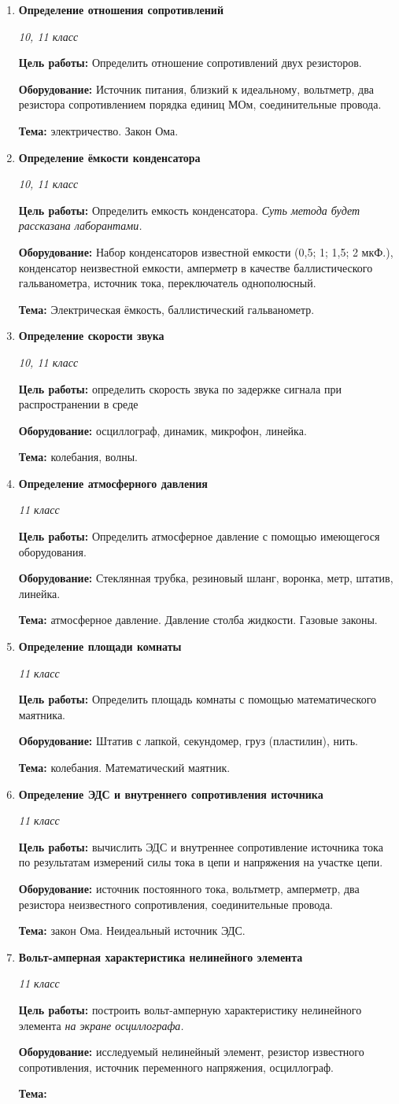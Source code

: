 \documentclass[a4paper,10pt]{article}
\newcommand{\labtitle}[5]{
	\textbf{#2}\par
	\textit{#1 класс}\par
	\textbf{Цель работы:} #3\par
	\textbf{Оборудование:} #4\par
	\textbf{Тема:} #5
}
\begin{document}
\begin{enumerate}
	\item \labtitle
		{10, 11}
		{Определение отношения сопротивлений}
		{Определить отношение сопротивлений двух резисторов.}
		{Источник питания, близкий к идеальному, вольтметр, два резистора сопротивлением порядка единиц МОм, соединительные провода.}
		{электричество. Закон Ома.}
	\item \labtitle
		{10, 11}
		{Определение ёмкости конденсатора}
		{Определить емкость конденсатора. \textit{Суть метода будет рассказана лаборантами.}}
		{Набор конденсаторов известной емкости (0,5; 1; 1,5; 2 мкФ.), конденсатор неизвестной емкости, амперметр в качестве баллистического гальванометра, источник тока, переключатель однополюсный.}
		{Электрическая ёмкость, баллистический гальванометр.}
	\item \labtitle
		{10, 11}
		{Определение скорости звука}
		{определить скорость звука по задержке сигнала при распространении в среде}
		{осциллограф, динамик, микрофон, линейка.}
		{колебания, волны.}
	\item \labtitle
		{11}
		{Определение атмосферного давления}
		{Определить атмосферное давление с помощью имеющегося оборудования.}
		{Стеклянная трубка, резиновый шланг, воронка, метр, штатив, линейка.}
		{атмосферное давление. Давление столба жидкости. Газовые законы.}
	\item \labtitle
		{11}
		{Определение площади комнаты}
		{Определить площадь комнаты с помощью математического маятника.}
		{Штатив с лапкой, секундомер, груз (пластилин), нить.}
		{колебания. Математический маятник.}
	\item \labtitle
		{11}
		{Определение ЭДС и внутреннего сопротивления источника}
		{вычислить ЭДС и внутреннее сопротивление источника тока по результатам измерений силы тока в цепи и напряжения на участке цепи.}
		{источник постоянного тока, вольтметр, амперметр, два резистора неизвестного сопротивления, соединительные провода.}
		{закон Ома. Неидеальный источник ЭДС.}
	\item \labtitle
		{11}
		{Вольт-амперная характеристика нелинейного элемента}
		{построить вольт-амперную характеристику нелинейного элемента \textit{на экране осциллографа.}}
		{исследуемый нелинейный элемент, резистор известного сопротивления, источник переменного напряжения, осциллограф.}

\end{enumerate}
\end{document}
